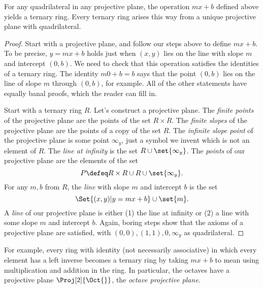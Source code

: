 \begin{theorem}
For any quadrilateral in any projective plane, the operation \(mx+b\) defined above yields a ternary ring.
Every ternary ring arises this way from a unique projective plane with quadrilateral.
\end{theorem}
\begin{proof}
Start with a projective plane, and follow our steps above to define \(mx+b\).
To be precise, \(y=mx+b\) holds just when \((x,y)\) lies on the line with slope \(m\) and intercept \((0,b)\).
We need to check that this operation satisfies the identities of a ternary ring.
The identity \(m0+b=b\) says that the point \((0,b)\) lies on the line of slope \(m\) through \((0,b)\), for example.
All of the other statements have equally banal proofs, which the reader can fill in.

Start with a ternary ring \(R\).
Let's construct a projective plane.
The \emph{finite points} of the projective plane are the points of the set \(R \times R\).
The \emph{finite slopes} of the projective plane are the points of a copy of the set \(R\).
The \emph{infinite slope point} of the projective plane is some point \(\infty_y\), just a symbol we invent which is not an element of \(R\).
The \emph{line at infinity} is the set \(R \cup \set{\infty_y}\).
The \emph{points} of our projective plane are the elements of the set 
\[
P \defeq R \times R \cup R \cup \set{\infty_y}.
\]
For any \(m, b\) from \(R\), the \emph{line} with slope \(m\) and intercept \(b\) is the set
\[
\Set{(x,y)|y=mx+b} \cup \set{m}.
\]
A \emph{line} of our projective plane is either (1) the line at infinity or (2) a line with some slope \(m\) and intercept \(b\).
Again, boring steps show that the axioms of a projective plane are satisfied, with \((0,0),(1,1),0,\infty_y\) as quadrilateral.
\end{proof}

For example, every ring with identity (not necessarily associative) in which every element has a left inverse becomes a ternary ring by taking \(mx+b\) to mean using multiplication and addition in the ring.
In particular, the octaves have a projective plane \(\Proj[2]{\Oct{}}\), the \emph{octave projective plane}.

